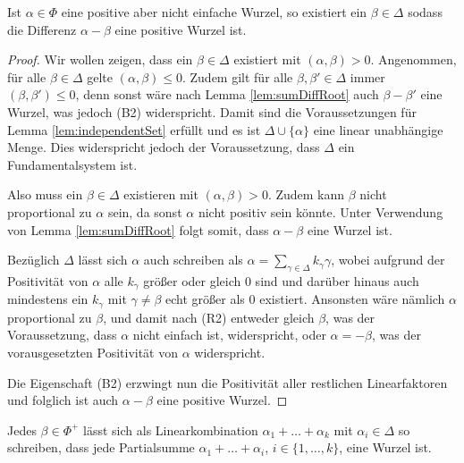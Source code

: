 \begin{lem}
  \label{lem:posRootNewRoot}
  Ist $\alpha \in \Phi$ eine positive aber nicht einfache Wurzel, so existiert ein $\beta \in \Delta$ sodass die Differenz $\alpha - \beta$ eine positive Wurzel ist.
\end{lem}

\begin{proof}
  Wir wollen zeigen, dass ein $\beta \in \Delta$ existiert mit $(\alpha, \beta) > 0$.
  Angenommen, für alle $\beta \in \Delta$ gelte $(\alpha, \beta) \leq 0$.
  Zudem gilt für alle $\beta, \beta' \in \Delta$ immer $(\beta, \beta') \leq 0$, denn sonst wäre nach Lemma \ref{lem:sumDiffRoot} auch $\beta - \beta'$ eine Wurzel, was jedoch (B2) widerspricht.
  Damit sind die Voraussetzungen für Lemma \ref{lem:independentSet} erfüllt und es ist $\Delta \cup \{\alpha\}$ eine linear unabhängige Menge.
  Dies widerspricht jedoch der Voraussetzung, dass $\Delta$ ein Fundamentalsystem ist.

  Also muss ein $\beta \in \Delta$ existieren mit $(\alpha, \beta) > 0$.
  Zudem kann $\beta$ nicht proportional zu $\alpha$ sein, da sonst $\alpha$ nicht positiv sein könnte.
  Unter Verwendung von Lemma \ref{lem:sumDiffRoot} folgt somit, dass $\alpha - \beta$ eine Wurzel ist.
  
  Bezüglich $\Delta$ lässt sich $\alpha$ auch schreiben als $\alpha = \sum_{\gamma \in \Delta} k_\gamma \gamma$, wobei aufgrund der Positivität von $\alpha$ alle $k_\gamma$ größer oder gleich $0$ sind und darüber hinaus auch mindestens ein $k_\gamma$ mit $\gamma \neq \beta$ echt größer als $0$ existiert.
  Ansonsten wäre nämlich $\alpha$ proportional zu $\beta$, und damit nach (R2) entweder gleich $\beta$, was der Voraussetzung, dass $\alpha$ nicht einfach ist, widerspricht, oder $\alpha = -\beta$, was der vorausgesetzten Positivität von $\alpha$ widerspricht.

  Die Eigenschaft (B2) erzwingt nun die Positivität aller restlichen Linearfaktoren und folglich ist auch $\alpha - \beta$ eine positive Wurzel.
\end{proof}
 
\begin{cor}
  Jedes $\beta \in \Phi^+$ lässt sich als Linearkombination $\alpha_1 + \dots + \alpha_k$ mit $\alpha_i \in \Delta$ so schreiben, dass jede Partialsumme $\alpha_1 + \dots + \alpha_i$, $i \in \{1,\dots,k\}$, eine Wurzel ist.
\end{cor}

